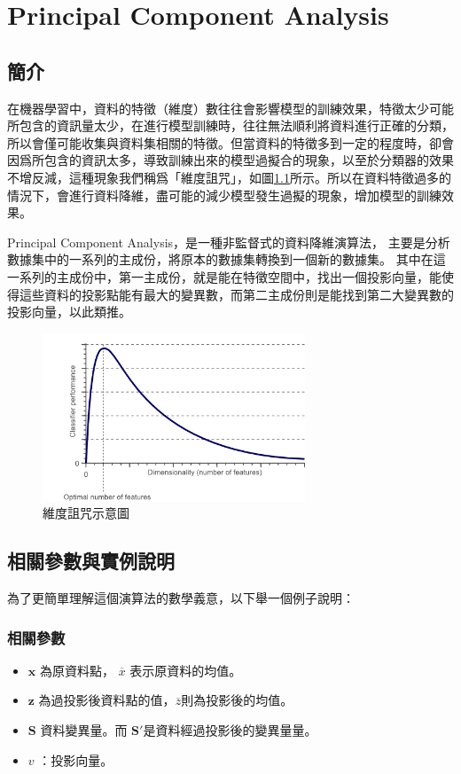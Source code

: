 \chapter{Principal Component Analysis}
\label{chapter:pca}
\section{簡介}
\label{sec:background}


在機器學習中，資料的特徵（維度）數往往會影響模型的訓練效果，特徵太少可能所包含的資訊量太少，在進行模型訓練時，往往無法順利將資料進行正確的分類，所以會僅可能收集與資料集相關的特徵。但當資料的特徵多到一定的程度時，卻會因爲所包含的資訊太多，導致訓練出來的模型過擬合的現象，以至於分類器的效果不增反減，這種現象我們稱爲「維度詛咒」，如圖\ref{fig:curse_of_dimesionality}所示。所以在資料特徵過多的情況下，會進行資料降維，盡可能的減少模型發生過擬的現象，增加模型的訓練效果。

Principal Component Analysis，是一種非監督式的資料降維演算法，
主要是分析數據集中的一系列的主成份，將原本的數據集轉換到一個新的數據集。
其中在這一系列的主成份中，第一主成份，就是能在特徵空間中，找出一個投影向量，能使得這些資料的投影點能有最大的變異數，而第二主成份則是能找到第二大變異數的投影向量，以此類推。




\begin{figure}[h]
	\centering
	\includegraphics[height=5cm]{./pic/NZgacRXF.png}
	\caption{維度詛咒示意圖}
	\label{fig:curse_of_dimesionality}
\end{figure}

\section{相關參數與實例說明}
為了更簡單理解這個演算法的數學義意，以下舉一個例子說明：

\subsection{相關參數}
\begin{itemize}
	\item
		\(\mathbf{x}\) 為原資料點， \(\overline{x}\) 表示原資料的均值。
	\item
	     \(\mathbf{z}\) 為過投影後資料點的值，\(\overline{z}\)則為投影後的均值。 
	\item
	      \(\mathbf{S}\) 資料變異量。而 \(\mathbf{{S}'}\)是資料經過投影後的變異量量。
	\item
	      \(v\) ：投影向量。
\end{itemize}


